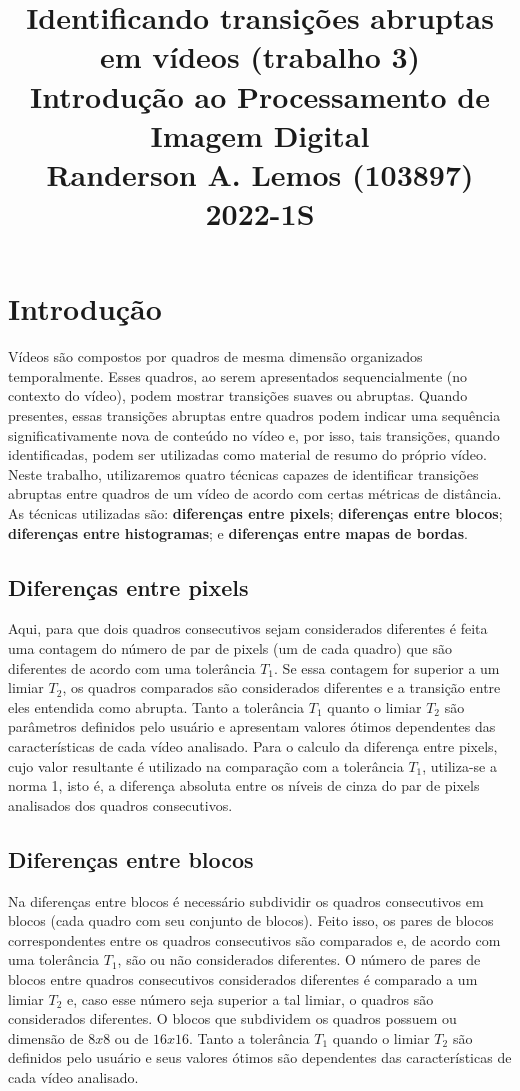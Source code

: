 \documentclass{article}
\title{
	Identificando transições abruptas em vídeos (trabalho 3) \\
	\Large Introdução ao Processamento de Imagem Digital \\
	Randerson A. Lemos (103897)
	2022-1S
}
\date{\vspace{-5ex}}
\begin{document}
  \maketitle

%
\section{Introdução}
Vídeos são compostos por quadros de mesma dimensão organizados temporalmente. Esses quadros, ao serem apresentados sequencialmente (no contexto do vídeo), podem mostrar transições suaves ou abruptas. Quando presentes, essas transições abruptas entre quadros podem indicar uma sequência significativamente nova de conteúdo no vídeo e, por isso, tais transições, quando identificadas, podem ser utilizadas como material de resumo do próprio vídeo. Neste trabalho, utilizaremos quatro técnicas capazes de identificar transições abruptas entre quadros de um vídeo de acordo com certas métricas de distância. As técnicas utilizadas são: \textbf{diferenças entre pixels}; \textbf{diferenças entre blocos}; \textbf{diferenças entre histogramas}; e \textbf{diferenças entre mapas de bordas}.

%
\subsection{Diferenças entre pixels}
Aqui, para que dois quadros consecutivos sejam considerados diferentes é feita uma contagem do número de par de pixels (um de cada quadro) que são diferentes de acordo com uma tolerância $T_1$. Se essa contagem for superior a um limiar $T_2$, os quadros comparados são considerados diferentes e a transição entre eles entendida como abrupta. Tanto a tolerância $T_1$ quanto o limiar $T_2$ são parâmetros definidos pelo usuário e apresentam valores ótimos dependentes das características de cada vídeo analisado. Para o calculo da diferença entre pixels, cujo valor resultante é utilizado na comparação com a tolerância $T_1$, utiliza-se a norma 1, isto é, a diferença absoluta entre os níveis de cinza do par de pixels analisados dos quadros consecutivos.

%
\subsection{Diferenças entre blocos}
Na diferenças entre blocos é necessário subdividir os quadros consecutivos em blocos (cada quadro com seu conjunto de blocos). Feito isso, os pares de blocos correspondentes entre os quadros consecutivos são comparados e, de acordo com uma tolerância $T_1$, são ou não considerados diferentes. O número de pares de blocos entre quadros consecutivos considerados diferentes é comparado a um limiar $T_2$ e, caso esse número seja superior a tal limiar, o quadros são considerados diferentes. O blocos que subdividem os quadros possuem ou dimensão de $8x8$ ou de $16x16$. Tanto a tolerância $T_1$ quando o limiar $T_2$ são definidos pelo usuário e seus valores ótimos são dependentes das características de cada vídeo analisado.
\end{document}
